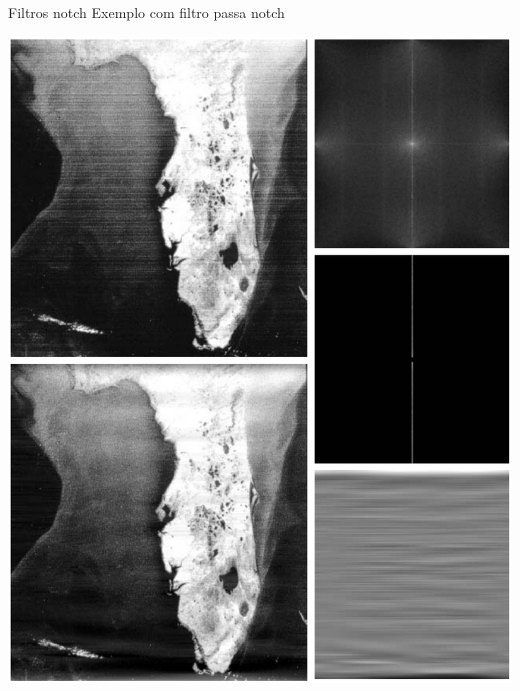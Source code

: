 \begin{slide}{Filtros notch}
	Exemplo com filtro passa notch
	\begin{center}
		\includegraphics[height = 0.7\textheight]{figs/5-19}
	\end{center}

\end{slide}


